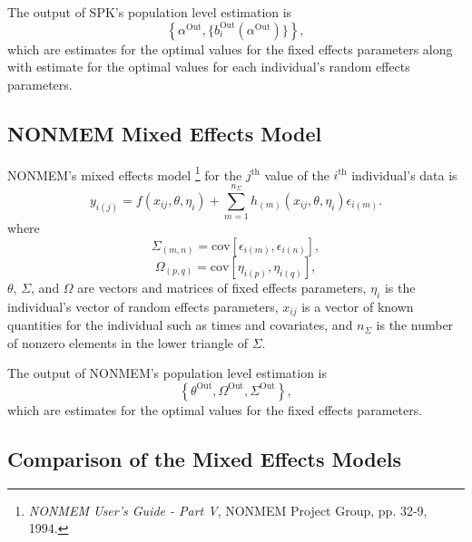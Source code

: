 \documentclass{article}
\begin{document}
The output of SPK's population level estimation is
  \begin{equation}
    \left\{ \alpha^{\mbox{Out}}, 
      \{ b_i^{\mbox{Out}} ( \alpha^{\mbox{Out}} ) \} \right\} ,
  \end{equation}
which are estimates for the optimal values for the fixed 
effects parameters along with estimate for the optimal values
for each individual's random effects parameters.


\subsection{NONMEM Mixed Effects Model}

NONMEM's mixed effects model 
\footnote{
  {\em NONMEM User's Guide - Part V}, NONMEM Project Group, 
  pp. 32-9, 1994.
} 
for the $j^{\mbox{th}}$ value of the $i^{\mbox{th}}$ individual's data is 
  \begin{equation}
    y_{i(j)} = f(x_{ij}, \theta, \eta_i) + 
      \sum_{m=1}^{n_{\Sigma}} h_{(m)}(x_{ij}, \theta, \eta_i) \epsilon_{i(m)} .
  \end{equation}
where
  \begin{equation}
    \Sigma_{(m,n)} = \mbox{cov}[\epsilon_{i(m)},\epsilon_{i(n)}] ,
  \end{equation}
  \begin{equation}
    \Omega_{(p,q)} = \mbox{cov}[\eta_{i(p)},\eta_{i(q)}] ,
  \end{equation}
$\theta$, $\Sigma$, and $\Omega$ are vectors and matrices of fixed effects parameters,
$\eta_i$ is the individual's vector of random effects parameters,
$x_{ij}$ is a vector of known quantities for the individual
such as times and covariates,
and $n_{\Sigma}$ is the number of nonzero elements in the lower 
triangle of $\Sigma$.

The output of NONMEM's population level estimation is
  \begin{equation}
    \left\{ \theta^{\mbox{Out}}, \Omega^{\mbox{Out}},
      \Sigma^{\mbox{Out}} \right\} ,
  \end{equation}
which are estimates for the optimal values for the fixed 
effects parameters.


\subsection{Comparison of the Mixed Effects Models}
\end{document}
